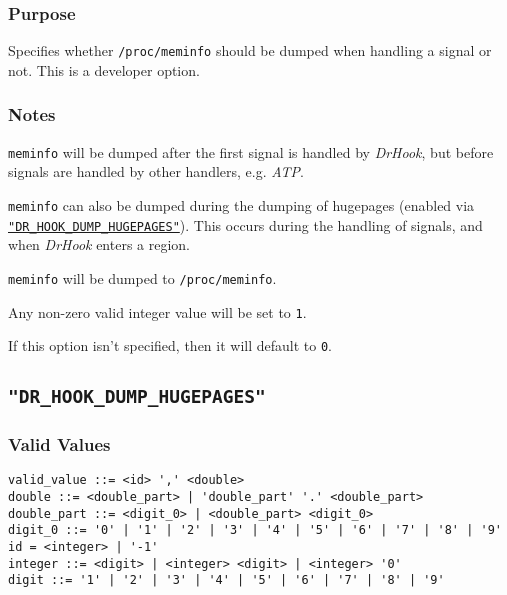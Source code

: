 \vspace{-2ex}
\subsubsection{Purpose}
\vspace{-2ex}
Specifies whether \verb|/proc/meminfo| should be dumped when handling a signal or not. This is a developer option.

\vspace{-2ex}
\subsubsection{Notes}
\vspace{-2ex}
\texttt{meminfo} will be dumped after the first signal is handled by \textit{DrHook}, but before signals are handled by other handlers, e.g. \textit{ATP}.

\texttt{meminfo} can also be dumped during the dumping of hugepages (enabled via \hyperref[section:flags:DR_HOOK_DUMP_HUGEPAGES]{\texttt{"DR\_HOOK\_DUMP\_HUGEPAGES"}}). This occurs during the handling of signals, and when \textit{DrHook} enters a region.

\texttt{meminfo} will be dumped to \verb|/proc/meminfo|.

Any non-zero valid integer value will be set to \verb|1|.

If this option isn't specified, then it will default to \verb|0|.



\subsection{\texttt{"DR\_HOOK\_DUMP\_HUGEPAGES"}}
\label{section:flags:DR_HOOK_DUMP_HUGEPAGES}
\vspace{-2ex}
\subsubsection{Valid Values}
\vspace{-2ex}
\verb+valid_value ::= <id> ',' <double>+ \\
\verb+double ::= <double_part> | 'double_part' '.' <double_part>+ \\
\verb+double_part ::= <digit_0> | <double_part> <digit_0>+ \\
\verb+digit_0 ::= '0' | '1' | '2' | '3' | '4' | '5' | '6' | '7' | '8' | '9'+\\
\verb+id = <integer> | '-1'+\\
\verb+integer ::= <digit> | <integer> <digit> | <integer> '0'+ \\
\verb+digit ::= '1' | '2' | '3' | '4' | '5' | '6' | '7' | '8' | '9'+

